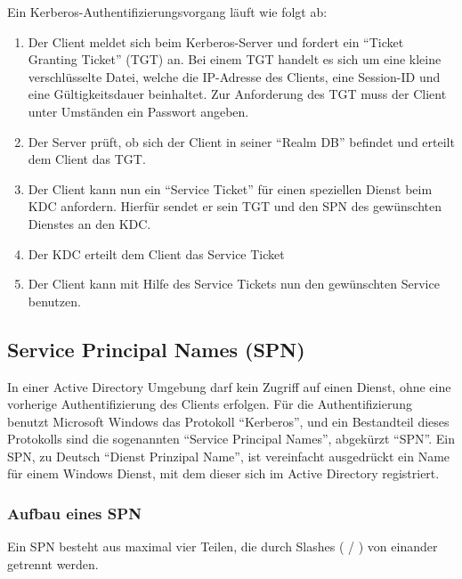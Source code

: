            Ein Kerberos-Authentifizierungsvorgang läuft wie folgt ab:
          \begin{enumerate}
            \item Der Client meldet sich beim Kerberos-Server und fordert ein
            \enquote{Ticket Granting Ticket} (TGT) an. Bei einem TGT handelt es
            sich um eine kleine verschlüsselte Datei, welche die IP-Adresse des
            Clients, eine Session-ID und eine Gültigkeitsdauer beinhaltet. Zur
            Anforderung des TGT muss der Client unter Umständen ein Passwort
            angeben.
            \item Der Server prüft, ob sich der Client in seiner
            \enquote{Realm DB} befindet und erteilt dem Client das TGT.
            \item Der Client kann nun ein \enquote{Service Ticket} für einen
            speziellen Dienst beim KDC anfordern. Hierfür sendet er sein TGT
            und den SPN des gewünschten Dienstes an den KDC.
            \item Der KDC erteilt dem Client das Service Ticket
            \item Der Client kann mit Hilfe des Service Tickets nun den
            gewünschten Service benutzen.
          \end{enumerate}
          \begin{literaturinternet}
            \item \cite{cc280744}
            \item \cite{cc280745}
            \item \cite{wikipTicketGrantingTicket}
          \end{literaturinternet}
      \subsection{Service Principal Names (SPN)}
        In einer Active Directory Umgebung darf kein Zugriff auf einen
        Dienst, ohne eine vorherige Authentifizierung des Clients erfolgen. Für die
        Authentifizierung benutzt Microsoft Windows das Protokoll \enquote{Kerberos}, und ein
        Bestandteil dieses Protokolls sind die sogenannten \enquote{Service
        Principal Names}, abgekürzt \enquote{SPN}. Ein SPN, zu Deutsch
        \enquote{Dienst Prinzipal Name}, ist vereinfacht ausgedrückt ein Name für
        einem Windows Dienst, mit dem dieser sich im Active Directory registriert.
        \subsubsection{Aufbau eines SPN}
          Ein SPN besteht aus maximal vier Teilen, die durch Slashes ( / ) von
          einander getrennt werden.
        

